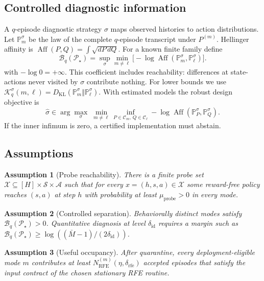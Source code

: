 \documentclass[11pt]{article}
\newtheorem{assumption}{Assumption}
\newcommand{\Aff}{\operatorname{Aff}}
\newcommand{\KL}{D_{\mathrm{KL}}}
\newcommand{\cP}{\mathcal{P}}
\newcommand{\cS}{\mathcal{S}}
\newcommand{\cA}{\mathcal{A}}
\newcommand{\cC}{\mathcal{C}}
\newcommand{\cX}{\mathcal{X}}
\newcommand{\deltaid}{\delta_{\mathrm{id}}}
\newcommand{\deltarfe}{\delta_{\mathrm{rfe}}}
\begin{document}
\subsection{Controlled diagnostic information}
A $q$-episode diagnostic strategy $\sigma$ maps observed histories to action
distributions. Let $\mathbb{P}_m^\sigma$ be the law of the complete $q$-episode
transcript under $P^{(m)}$. Hellinger affinity is
$\Aff(P,Q)=\int\sqrt{dP\,dQ}$. For a known finite family define
\begin{equation}
\label{eq:DI}
\mathcal{B}_q(\cP_\star)
=\sup_{\sigma}\min_{m\neq\ell}
\bigl[-\log\Aff(\mathbb{P}_m^\sigma,\mathbb{P}_\ell^\sigma)\bigr].
\end{equation}
with $-\log 0=+\infty$. This coefficient includes reachability: differences at
state-actions never visited by $\sigma$ contribute nothing. For lower bounds
we use $\mathcal{K}_q^\sigma(m,\ell)=\KL(\mathbb{P}_m^\sigma\Vert
\mathbb{P}_\ell^\sigma)$. With estimated models the robust design objective is
\begin{equation}
\label{eq:RDI}
\widehat\sigma\in\arg\max_\sigma\;
\min_{m\neq\ell}\inf_{P\in\cC_m,\,Q\in\cC_\ell}
-\log\Aff(\mathbb{P}_P^\sigma,\mathbb{P}_Q^\sigma).
\end{equation}
If the inner infimum is zero, a certified implementation must abstain.

\subsection{Assumptions}
\begin{assumption}[Probe reachability]
\label{ass:reach}
There is a finite probe set $\cX\subseteq[H]\times\cS\times\cA$ such that for
every $x=(h,s,a)\in\cX$ some reward-free policy reaches $(s,a)$ at step $h$
with probability at least $\mu_{\mathrm{probe}}>0$ in every mode.
\end{assumption}

\begin{assumption}[Controlled separation]
\label{ass:sep}
Behaviorally distinct modes satisfy $\mathcal{B}_q(\cP_\star)>0$. Quantitative
diagnosis at level $\deltaid$ requires a margin such as
$\mathcal{B}_q(\cP_\star)\ge\log((\bar M-1)/(2\deltaid))$.
\end{assumption}

\begin{assumption}[Useful occupancy]
\label{ass:occ}
After quarantine, every deployment-eligible mode $m$ contributes at least
$N_{\mathrm{RFE}}^{(m)}(\eta,\deltarfe)$ accepted episodes that satisfy the
input contract of the chosen stationary RFE routine.
\end{assumption}
\end{document}
